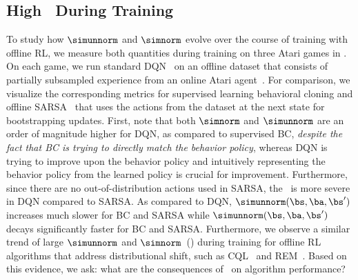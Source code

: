 \subsection{High \AliasingProblemName\ During Training}
\label{sec:bootstrapping_evidence}
To study how $\simunnorm$ and $\simnorm$ evolve over the course of training with offline RL, we measure both quantities during training on three Atari games in .
On each game, we run standard DQN~\citep{Mnih2015} on an offline dataset that consists of partially subsampled experience from an online Atari agent~\citep{agarwal2019optimistic}. For comparison, we visualize the corresponding metrics for supervised learning behavioral cloning and offline SARSA~\citep{rummery1994line} that uses the actions from the dataset at the next state for bootstrapping updates. First, note that both $\simnorm$ and $\simunnorm$ are an order of magnitude higher for DQN, as compared to supervised BC, \emph{despite the fact that BC is trying to directly match the behavior policy}, whereas DQN is trying to improve upon the behavior policy and intuitively representing the behavior policy from the learned policy is crucial for improvement. Furthermore, since there are no out-of-distribution actions used in SARSA, the \aliasingproblemname\ is more severe in DQN compared to SARSA.
As compared to DQN, $\simunnorm(\bs, \ba, \bs')$ increases much slower for BC and SARSA while $\simunnorm(\bs, \ba, \bs')$ decays significantly faster for BC and SARSA.
Furthermore, we observe a similar trend of large $\simunnorm$ and $\simnorm$~() during training for offline RL algorithms that address distributional shift, such as CQL~\citep{kumar2020conservative} and REM~\citep{agarwal2019optimistic}. Based on this evidence, we ask: 
what are the consequences of \aliasingproblemname\ on algorithm performance? 


